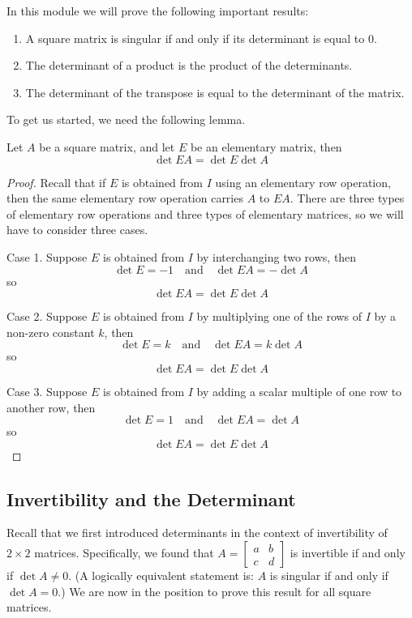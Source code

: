 \documentclass{ximera}
\begin{document}
In this module we will prove the following important results:
\begin{enumerate}
\item A square matrix is singular if and only if its determinant is equal to 0.
\item The determinant of a product is the product of the determinants.
\item The determinant of the transpose is equal to the determinant of the matrix.
\end{enumerate}
To get us started, we need the following lemma.
\begin{lemma}\label{lemma:detelemproduct} Let $A$ be a square matrix, and let $E$ be an elementary matrix, then
$$\det{EA}=\det{E}\det{A}$$
\end{lemma}
\begin{proof} Recall that if $E$ is obtained from $I$ using an elementary row operation, then the same elementary row operation carries $A$ to $EA$.  There are three types of elementary row operations and three types of elementary matrices, so we will have to consider three cases.

Case 1.  Suppose $E$ is obtained from $I$ by interchanging two rows, then
$$\det{E}=-1\quad\text{and}\quad \det{EA}=-\det{A}$$
so
$$\det{EA}=\det{E}\det{A}$$

Case 2.  Suppose $E$ is obtained from $I$ by multiplying one of the rows of $I$ by a non-zero constant $k$, then
$$\det{E}=k\quad\text{and}\quad \det{EA}=k\det{A}$$
so
$$\det{EA}=\det{E}\det{A}$$

Case 3.  Suppose $E$ is obtained from $I$ by adding a scalar multiple of one row to another row, then
$$\det{E}=1\quad\text{and}\quad \det{EA}=\det{A}$$
so
$$\det{EA}=\det{E}\det{A}$$
\end{proof}
\subsection*{Invertibility and the Determinant}
Recall that we first introduced determinants in the context of invertibility of $2\times 2$ matrices. Specifically, we found that $A=\begin{bmatrix}a&b\\c&d\end{bmatrix}$ is invertible if and only if $\det{A}\neq 0$.  (A logically equivalent statement is: $A$ is singular if and only if $\det{A}=0$.)   We are now in the position to prove this result for all square matrices.
\end{document}
